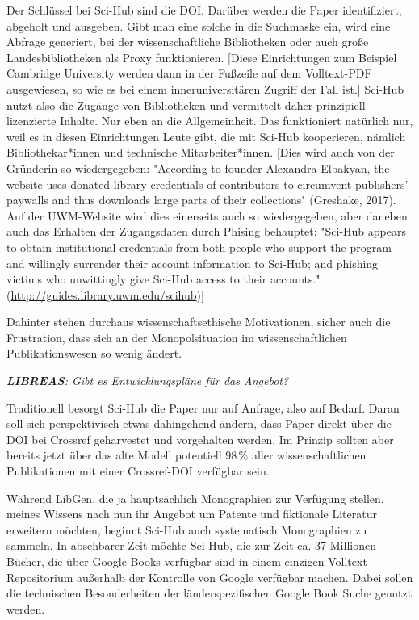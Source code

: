\documentclass[a4paper,
fontsize=11pt,
oneside,
numbers=noperiodatend,
parskip=half-,
bibliography=totoc,
final
]{scrartcl}
\begin{document}
Der Schlüssel bei Sci-Hub sind die DOI. Darüber werden die Paper
identifiziert, abgeholt und ausgeben. Gibt man eine solche in die
Suchmaske ein, wird eine Abfrage generiert, bei der wissenschaftliche
Bibliotheken oder auch große Landesbibliotheken als Proxy funktionieren.
{[}Diese Einrichtungen zum Beispiel Cambridge University werden dann in
der Fußzeile auf dem Volltext-PDF ausgewiesen, so wie es bei einem
inneruniversitären Zugriff der Fall ist.{]} Sci-Hub nutzt also die
Zugänge von Bibliotheken und vermittelt daher prinzipiell lizenzierte
Inhalte. Nur eben an die Allgemeinheit. Das funktioniert natürlich nur,
weil es in diesen Einrichtungen Leute gibt, die mit Sci-Hub kooperieren,
nämlich Bibliothekar*innen und technische Mitarbeiter*innen. {[}Dies
wird auch von der Gründerin so wiedergegeben: "According to founder
Alexandra Elbakyan, the website uses donated library credentials of
contributors to circumvent publishers' paywalls and thus downloads large
parts of their collections" (Greshake, 2017). Auf der UWM-Website wird
dies einerseits auch so wiedergegeben, aber daneben auch das Erhalten
der Zugangsdaten durch Phising behauptet: "Sci-Hub appears to obtain
institutional credentials from both people who support the program and
willingly surrender their account information to Sci-Hub; and phishing
victims who unwittingly give Sci-Hub access to their accounts."
(\url{http://guides.library.uwm.edu/scihub}){]}

Dahinter stehen durchaus wissenschaftsethische Motivationen, sicher auch
die Frustration, dass sich an der Monopolsituation im wissenschaftlichen
Publikationswesen so wenig ändert.

\emph{\textbf{LIBREAS}: Gibt es Entwicklungspläne für das Angebot?}

Traditionell besorgt Sci-Hub die Paper nur auf Anfrage, also auf Bedarf.
Daran soll sich perspektivisch etwas dahingehend ändern, dass Paper
direkt über die DOI bei Crossref geharvestet und vorgehalten werden. Im
Prinzip sollten aber bereits jetzt über das alte Modell potentiell
98\,\% aller wissenschaftlichen Publikationen mit einer Crossref-DOI
verfügbar sein.

Während LibGen, die ja hauptsächlich Monographien zur Verfügung stellen,
meines Wissens nach nun ihr Angebot um Patente und fiktionale Literatur
erweitern möchten, beginnt Sci-Hub auch systematisch Monographien zu
sammeln. In absehbarer Zeit möchte Sci-Hub, die zur Zeit ca. 37
Millionen Bücher, die über Google Books verfügbar sind in einem einzigen
Volltext-Repositorium außerhalb der Kontrolle von Google verfügbar
machen. Dabei sollen die technischen Besonderheiten der
länderspezifischen Google Book Suche genutzt werden.
\end{document}
